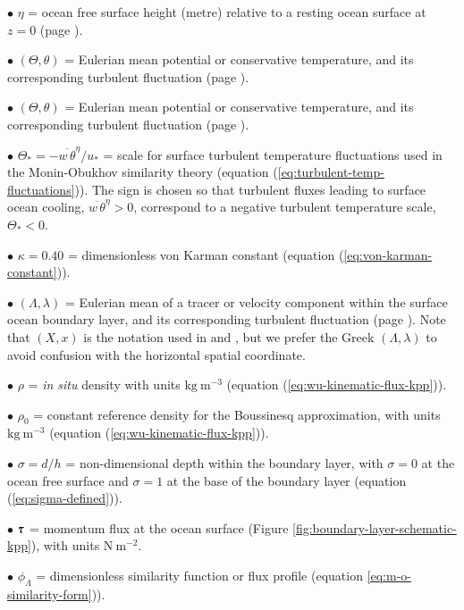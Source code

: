 \begin{mdframed}[backgroundcolor=lightgray!50]
\begin{trivlist}
\item[$\bullet$] $\eta$ = ocean free surface height (metre) relative
  to a resting ocean surface at $z=0$ (page
  \pageref{geopotential_defined}).

\item[$\bullet$] $(\Theta,\theta)$ = Eulerian mean potential or conservative
  temperature, and its corresponding turbulent fluctuation (page
  \pageref{Lambda_defined}).

\item[$\bullet$] $(\Theta,\theta)$ = Eulerian mean potential or conservative
  temperature, and its corresponding turbulent fluctuation (page
  \pageref{Lambda_defined}).

\item[$\bullet$] $\Theta_{*} = -\overline{w \, \theta}^{\eta} / u_{*}$
  = scale for surface turbulent temperature fluctuations used in the
  Monin-Obukhov similarity theory (equation
  (\ref{eq:turbulent-temp-fluctuations})).  The sign is chosen so that
  turbulent fluxes leading to surface ocean cooling, $\overline{w \,
    \theta}^{\eta} > 0$, correspond to a negative turbulent
  temperature scale, $\Theta_{*} < 0$.

\item[$\bullet$] $\kappa = 0.40$ = dimensionless von Karman constant
  (equation (\ref{eq:von-karman-constant})).

\item[$\bullet$] $(\Lambda,\lambda)$ = Eulerian mean of a tracer or velocity
  component within the surface ocean boundary layer, and its
  corresponding turbulent fluctuation (page \pageref{lambda_defined}).
  Note that $(X,x)$ is the notation used in \cite{LargeKPP} and
  \cite{LargeKPP_lectures}, but we prefer the Greek
  $(\Lambda,\lambda)$ to avoid confusion with the horizontal spatial
  coordinate.

\item[$\bullet$] $\rho$ = {\it in situ} density with units
  $\mbox{kg}~\mbox{m}^{-3}$ (equation
  (\ref{eq:wu-kinematic-flux-kpp})).

\item[$\bullet$] $\rho_{0}$ = constant reference density for the
  Boussinesq approximation, with units $\mbox{kg}~\mbox{m}^{-3}$
  (equation (\ref{eq:wu-kinematic-flux-kpp})).

\item[$\bullet$] $\sigma = d/h$ = non-dimensional depth within the boundary
  layer, with $\sigma=0$ at the ocean free surface and $\sigma=1$ at
  the base of the boundary layer (equation (\ref{eq:sigma-defined})).

\item[$\bullet$] $\mbox{\boldmath $\tau$}$ = momentum flux at the ocean surface (Figure
  \ref{fig:boundary-layer-schematic-kpp}), with units
  $\mbox{N}~\mbox{m}^{-2}$.

\item[$\bullet$] $\phi_{\Lambda}$ = dimensionless similarity function
  or flux profile (equation \ref{eq:m-o-similarity-form})).

\end{trivlist}  
\end{mdframed}




